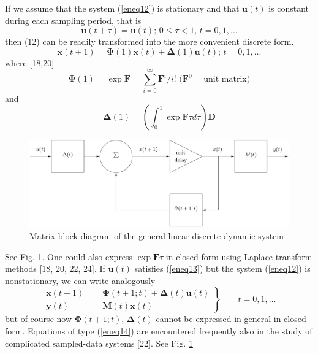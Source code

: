 \documentclass{article}
\newcommand{\vect}[1]{\mathbf{#1}}
\newcommand{\boldPhi}{\boldsymbol{\Phi}}
\newcommand{\boldDelta}{\boldsymbol{\Delta}}
\begin{document}
If we assume that the system (\ref{eneq12}) is stationary and that $\vect{u}(t)$ is constant during each sampling period, that is
\begin{equation}
\label{eneq13}
\mathbf{u}(t+\tau)=\mathbf{u}(t)\text{; }0 \le \tau < 1\text{, }t=0,1,\dotsc
\end{equation}
then (12) can be readily transformed into the more convenient discrete form.
\begin{equation*}
\mathbf{x}(t+1)=\boldsymbol{\Phi}(1)\mathbf{x}(t)+\boldsymbol{\Delta}(1)\mathbf{u}(t)\text{; }t=0,1,\dotsc
\end{equation*}
where [18,20]
\begin{equation*}
\boldsymbol{\Phi}(1)=\exp\mathbf{F}=\sum^\infty_{i=0}\mathbf{F}^i/i!\text{ (}\mathbf{F}^0=\text{unit matrix}\text{)}
\end{equation*}
and
\begin{equation*}
\boldsymbol{\Delta}(1)=\left(\int^1_0 \exp\mathbf{F}\tau d \tau\right)\mathbf{D}
\end{equation*}
\begin{figure}[htbp]
\centering
\includegraphics[width=0.5\paperwidth]{fig/fg2.pdf}
\caption{Matrix block diagram of the general linear discrete-dynamic system}
\label{enfg2}
\end{figure}
See Fig. \ref{enfg2}. One could also express $\exp \vect{F}\tau$ in closed form using Laplace transform methods [18, 20, 22, 24]. If $\vect{u}(t)$ satisfies (\ref{eneq13}) but the system (\ref{eneq12}) is nonstationary, we can write analogously
\begin{equation}
\label{eneq14}
\left.\begin{aligned}
\mathbf{x}(t+1)&=\boldsymbol{\Phi}(t+1;t)+\boldsymbol{\Delta}(t)\mathbf{u}(t)\\
\mathbf{y}(t)&=\mathbf{M}(t)\mathbf{x}(t)
\end{aligned}\right\}
\qquad t=0,1,\dotsc
\end{equation}
but of course now $\boldPhi(t + 1; t)$, $\boldDelta(t)$ cannot be expressed in general in closed form. Equations of type (\ref{eneq14}) are encountered frequently also in the study of complicated sampled-data systems [22]. See Fig. \ref{enfg2}
\end{document}
